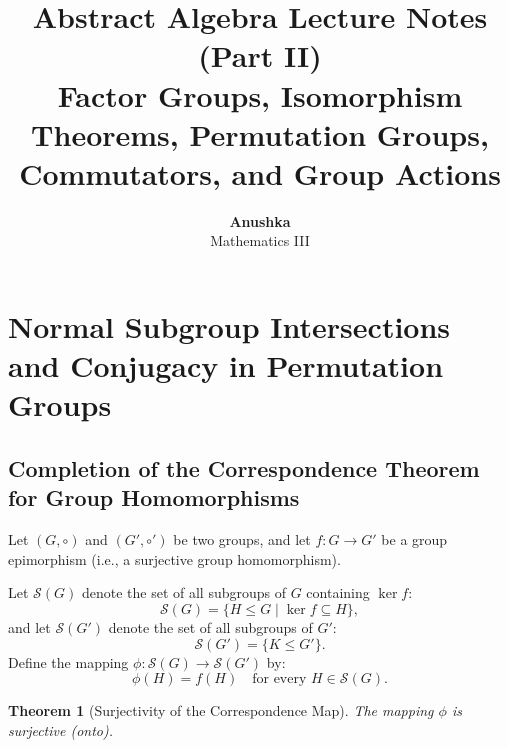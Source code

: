 \documentclass[12pt]{article}
\title{\textbf{\huge Abstract Algebra Lecture Notes (Part II)}\\[0.4em]
\Large Factor Groups, Isomorphism Theorems, Permutation Groups, Commutators, and Group Actions}
\author{\textbf{\Huge Anushka}\\[0.4em] \Large Mathematics III}
\date{}
\theoremstyle{definition}
\theoremstyle{plain}
\newtheorem{theorem}{Theorem}[section]
\begin{document}
\maketitle
\thispagestyle{empty}
\newpage

\tableofcontents
\newpage

\section{Normal Subgroup Intersections and Conjugacy in Permutation Groups}

\subsection{Completion of the Correspondence Theorem for Group Homomorphisms}

Let $(G, \circ)$ and $(G', \circ')$ be two groups, and let $f: G \to G'$ be a group epimorphism (i.e., a surjective group homomorphism). 

Let $\mathcal{S}(G)$ denote the set of all subgroups of $G$ containing $\ker f$:
\[
\mathcal{S}(G) = \{ H \le G \mid \ker f \subseteq H \},
\]
and let $\mathcal{S}(G')$ denote the set of all subgroups of $G'$:
\[
\mathcal{S}(G') = \{ K \le G' \}.
\]
Define the mapping $\phi: \mathcal{S}(G) \to \mathcal{S}(G')$ by:
\[
\phi(H) = f(H) \quad \text{for every } H \in \mathcal{S}(G).
\]

\begin{theorem}[Surjectivity of the Correspondence Map]
The mapping $\phi$ is surjective (onto).
\end{theorem}
\end{document}
